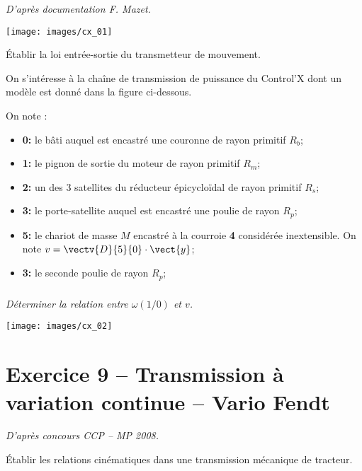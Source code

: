 \documentclass[10pt,fleqn]{article} %
\begin{document}
\begin{multicols}{2}
\begin{multicols}{2}
\textit{ D'après documentation F. Mazet.} \\


\begin{center}
\texttt{[image: images/cx\_01]}
\end{center}

\begin{obj} Établir la loi entrée-sortie du transmetteur de mouvement. 
\end{obj}


On s'intéresse à la chaîne de transmission de puissance du Control'X dont un modèle est donné dans la figure ci-dessous.

On note : 
\begin{itemize}
\item \textbf{0:} le bâti auquel est encastré une couronne de rayon primitif $R_b$;
\item \textbf{1:} le pignon de sortie du moteur de rayon primitif $R_m$;
\item \textbf{2:} un des 3 satellites du réducteur épicycloïdal de rayon primitif $R_s$;
\item \textbf{3:} le porte-satellite auquel est encastré une poulie de rayon $R_p$;
\item \textbf{5:} le chariot de masse $M$ encastré à la courroie \textbf{4} considérée inextensible. On note $v=\vectv{D}{5}{0}\cdot \vect{y}$;
\item \textbf{3:} le seconde poulie de rayon $R_p$;
\end{itemize}
\subparagraph{}
\textit{Déterminer la relation entre $\omega(1/0)$ et $v$.}



\ifprof
\begin{corrige}

\end{corrige}
\else
\fi

 
\begin{center}
\texttt{[image: images/cx\_02]}
\end{center}

\section*{Exercice 9 -- Transmission à variation continue -- Vario Fendt}
\setcounter{exo}{0}

\textit{D'après concours CCP -- MP 2008.}

\begin{obj} 
Établir les relations cinématiques dans une transmission mécanique de tracteur.
\end{obj}



\end{multicols}
\end{multicols}
\end{document}
